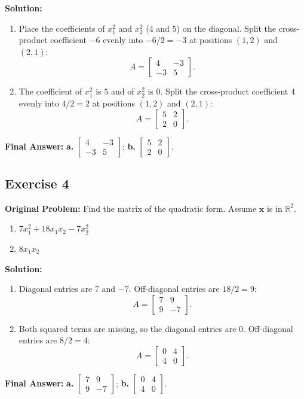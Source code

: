\documentclass[11pt, letterpaper]{article}
\theoremstyle{definition}
\theoremstyle{remark}
\begin{document}
\textbf{Solution:}
\begin{enumerate}[label=\alph*.]
    \item Place the coefficients of $x_1^2$ and $x_2^2$ ($4$ and $5$) on the diagonal. Split the cross-product coefficient $-6$ evenly into $-6/2 = -3$ at positions $(1,2)$ and $(2,1)$:
    \[
    A = \begin{bmatrix} 4 & -3 \\ -3 & 5 \end{bmatrix}.
    \]
    \item The coefficient of $x_1^2$ is $5$ and of $x_2^2$ is $0$. Split the cross-product coefficient $4$ evenly into $4/2 = 2$ at positions $(1,2)$ and $(2,1)$:
    \[
    A = \begin{bmatrix} 5 & 2 \\ 2 & 0 \end{bmatrix}.
    \]
\end{enumerate}
\textbf{Final Answer:} \textbf{a.} $\begin{bmatrix} 4 & -3 \\ -3 & 5 \end{bmatrix}$; \quad \textbf{b.} $\begin{bmatrix} 5 & 2 \\ 2 & 0 \end{bmatrix}$.

\hrulefill

\subsection*{Exercise 4}
\textbf{Original Problem:} Find the matrix of the quadratic form. Assume $\mathbf{x}$ is in $\mathbb{R}^2$.
\begin{enumerate}[label=\alph*.]
    \item $7x_1^2 + 18x_1x_2 - 7x_2^2$
    \item $8x_1x_2$
\end{enumerate}

\textbf{Solution:}
\begin{enumerate}[label=\alph*.]
    \item Diagonal entries are $7$ and $-7$. Off-diagonal entries are $18/2 = 9$:
    \[
    A = \begin{bmatrix} 7 & 9 \\ 9 & -7 \end{bmatrix}.
    \]
    \item Both squared terms are missing, so the diagonal entries are $0$. Off-diagonal entries are $8/2 = 4$:
    \[
    A = \begin{bmatrix} 0 & 4 \\ 4 & 0 \end{bmatrix}.
    \]
\end{enumerate}
\textbf{Final Answer:} \textbf{a.} $\begin{bmatrix} 7 & 9 \\ 9 & -7 \end{bmatrix}$; \quad \textbf{b.} $\begin{bmatrix} 0 & 4 \\ 4 & 0 \end{bmatrix}$.
\end{document}
